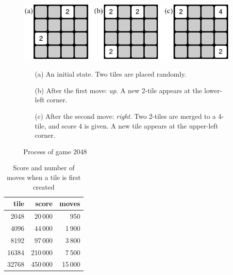 \begin{figure}[t]
  \begin{center}
    \includegraphics[width=.95\linewidth]{figures/2048RLJIP-1.pdf}\\[5pt]
  \begin{minipage}{.9\linewidth}
  \begin{enumerate}
   \item[(a)] An initial state. Two tiles are placed randomly.
   \item[(b)] After the first move: \emph{up}. A new 2-tile appears at the lower-left corner.
   \item[(c)] After the second move: \emph{right}. Two 2-tiles are merged to a 4-tile, and score 4 is given. A new tile appears at the upper-left corner.\\
  \end{enumerate}
  \end{minipage}
  \end{center}
 \caption{Process of game 2048~\cite{KoMa19}}
 \label{fig:game}
\end{figure}

\begin{table}[t]
 \caption{Score and number of moves when a tile is first created}
 \label{table:achievement}
 \centering\begin{tabular}{rrr}
\hline
\hline
  tile &     score  &   moves \\
\hline
  2048 &    20\,000 &     950 \\
  4096 &    44\,000 &  1\,900 \\
  8192 &    97\,000 &  3\,800 \\
 16384 &   210\,000 &  7\,500 \\
 32768 &   450\,000 & 15\,000 \\
\hline
 \end{tabular}
\end{table}

